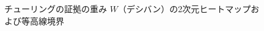 \begin{figure}[htbp]
  \centering
  \resizebox{0.88\linewidth}{!}{%
  }
  \caption{チューリングの証拠の重み $W$（デシバン）の2次元ヒートマップおよび等高線境界}
  \label{fig:deciban_heatmap}
\end{figure}

